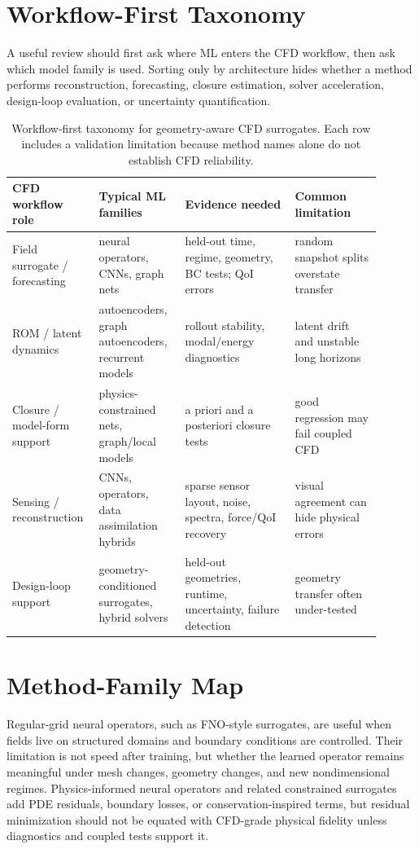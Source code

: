 \documentclass[11pt]{article}
\begin{document}
\section{Workflow-First Taxonomy}
A useful review should first ask where ML enters the CFD workflow, then ask which model family is used. Sorting only by architecture hides whether a method performs reconstruction, forecasting, closure estimation, solver acceleration, design-loop evaluation, or uncertainty quantification.

\begin{table}[t]
\centering
\caption{Workflow-first taxonomy for geometry-aware CFD surrogates. Each row includes a validation limitation because method names alone do not establish CFD reliability.}
\begin{tabular}{p{0.18\linewidth}p{0.22\linewidth}p{0.28\linewidth}p{0.22\linewidth}}
\toprule
CFD workflow role & Typical ML families & Evidence needed & Common limitation \\
\midrule
Field surrogate / forecasting & neural operators, CNNs, graph nets & held-out time, regime, geometry, BC tests; QoI errors & random snapshot splits overstate transfer \\
ROM / latent dynamics & autoencoders, graph autoencoders, recurrent models & rollout stability, modal/energy diagnostics & latent drift and unstable long horizons \\
Closure / model-form support & physics-constrained nets, graph/local models & a priori and a posteriori closure tests & good regression may fail coupled CFD \\
Sensing / reconstruction & CNNs, operators, data assimilation hybrids & sparse sensor layout, noise, spectra, force/QoI recovery & visual agreement can hide physical errors \\
Design-loop support & geometry-conditioned surrogates, hybrid solvers & held-out geometries, runtime, uncertainty, failure detection & geometry transfer often under-tested \\
\bottomrule
\end{tabular}
\end{table}

\section{Method-Family Map}
Regular-grid neural operators, such as FNO-style surrogates, are useful when fields live on structured domains and boundary conditions are controlled. Their limitation is not speed after training, but whether the learned operator remains meaningful under mesh changes, geometry changes, and new nondimensional regimes. Physics-informed neural operators and related constrained surrogates add PDE residuals, boundary losses, or conservation-inspired terms, but residual minimization should not be equated with CFD-grade physical fidelity unless diagnostics and coupled tests support it.
\end{document}
